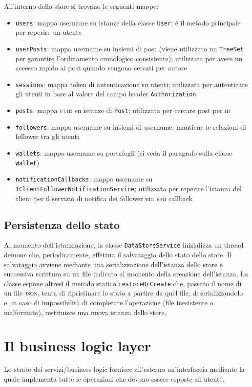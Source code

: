 \documentclass[a4paper,8pt]{article} %
\def\code#1{\texttt{#1}}
\begin{document}
\par All'interno dello store si trovano le seguenti mappe:
\begin{itemize}
    \item \code{users}: mappa username su istanze della classe \code{User}; è il metodo principale per reperire un utente
    \item \code{userPosts}: mappa username su insiemi di post (viene utilizzato un \code{TreeSet} per garantire l'ordinamento cronologico consistente); utilizzata per avere un accesso rapido ai post quando vengono cercati per autore
    \item \code{sessions}: mappa token di autenticazione su utenti; utilizzata per autenticare gli utenti in base al valore del campo header \code{Authorization}
    \item \code{posts}: mappa \textsc{uuid} su istanze di \code{Post}; utilizzata per cercare post per \textsc{id}
    \item \code{followers}: mappa username su insiemi di username; mantiene le relazioni di follower tra gli utenti
    \item \code{wallets}: mappa username su portafogli (si veda il paragrafo sulla classe \code{Wallet})
    \item \code{notificationCallbacks}: mappa username su \code{IClientFollowerNotificationService}; utilizzata per reperire l'istanza del client per il servizio di notifica dei follower via \textsc{rmi} callback
\end{itemize}
\subsection{Persistenza dello stato}
Al momento dell'istanziazione, la classe \code{DataStoreService} inizializza un thread demone che, periodicamente, effettua il salvataggio dello stato dello store.
Il salvataggio avviene mediante una serializzazione dell'istanza dello store e successiva scrittura su un file indicato al momento della creazione dell'istanza.
La classe espone altresì il metodo statico \code{restoreOrCreate} che, passato il nome di un file \textsc{json}, tenta di ripristinare lo stato a partire da quel file, deserializzandolo e, in caso
di impossibilità di completare l'operazione (file inesistente o malformato), restituisce una nuova istanza dello store.


\section{Il business logic layer}
Lo strato dei servizi/business logic fornisce all'esterno un'interfaccia mediante la quale implementa tutte le operazioni che devono essere esposte all'utente.
\end{document}
